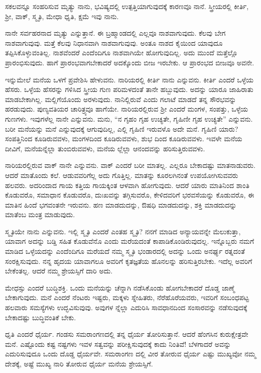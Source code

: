 {\small ಸಕಲವನ್ನೂ ಸಂಹರಿಸುವ ಮೃತ್ಯು ನಾನು, ಭವಿಷ್ಯದಲ್ಲಿ ಉತ್ಪತ್ತಿಯಾಗುವುದಕ್ಕೆ ಕಾರಣವೂ ನಾನೆ. ಸ್ತ್ರೀಯರಲ್ಲಿ ಕೀರ್ತಿ, ಶ‍್ರೀ, ವಾಕ್, ಸ್ಮೃತಿ, ಮೇಧಾ ಧೃತಿ, ಕ್ಷಮೆ ಇವು ನಾನು.}

ನಾನೇ ಸರ್ವಹರನಾದ ಮೃತ್ಯು ಎನ್ನುತ್ತಾನೆ. ಈ ಬ್ರಹ್ಮಾಂಡದಲ್ಲಿ ಎಲ್ಲವೂ ನಾಶವಾಗುವುದು. ಕೆಲವು ಬೇಗ ನಾಶವಾಗುವುವು. ಮತ್ತೆ ಕೆಲವು ನಿಧಾನವಾಗಿ ನಾಶವಾಗುವುವು. ಅಂತೂ ನಾಶದ ಕೈಯಿಂದ ಯಾವುದೂ ತಪ್ಪಿಸಿಕೊಳ್ಳುವಂತಿಲ್ಲ. ನಾಶವೆಂದರೆ ಎಂದೆಂದಿಗೂ ನಾಶವಾಗಿಯೇ ಹೋಗುವುದಿಲ್ಲ. ಅದು ಮುಂದೆ ಮತ್ತೆಲ್ಲೊ ಪ್ರಾರಂಭಿಸುವುದು. ಹಾಗೆ ಪ್ರಾರಂಭವಾಗಬೇಕಾದರೆ ಅದಕ್ಕೊಂದು ಬೀಜ ಇರಬೇಕು. ಆ ಪ್ರಾರಂಭದ ಬೀಜವೂ ಅವನೇ.

ಇನ್ನುಮೇಲೆ ಮನೆಯ ಒಳಗೆ ಪ್ರವೇಶಿಸಿ ಹೇಳುವನು. ನಾರಿಯರಲ್ಲಿ ಕೀರ್ತಿ ನಾನು ಎನ್ನುವನು. ಕೀರ್ತಿ ಎಂದರೆ ಒಳ್ಳೆಯ ಹೆಸರು. ಒಳ್ಳೆಯ ಹೆಸರನ್ನು ಗಳಿಸಿದ ಸ್ತ್ರೀಯ ಗುಣ ಪರಿಮಳದಂತೆ ತಾನೇ ಹಬ್ಬುವುದು. ಅದನ್ನು ಯಾರೂ ಜಾಹಿರಾತು ಮಾಡಬೇಕಾಗಿಲ್ಲ. ಮಲ್ಲಿಗೆಯೊಂದು ಅರಳುವುದು. ನಾನಿಲ್ಲಿರುವೆ ಎಂದು ಗಲಾಟೆ ಮಾಡದೆ ತನ್ನ ಸೌರಭವನ್ನು ಹರಡುವುದು. ಪುಣ್ಯವತಿಯರ ಚಾರಿತ್ರ್ಯವೂ ಹಾಗೆಯೇ. ನಾರಿಯರಲ್ಲಿರುವ ಶ‍್ರೀ ಎಂದರೆ ಮಂಗಳ, ಸಂಪತ್ತು, ಒಳ್ಳೆಯ ಗುಣಗಳು. ಇವುಗಳೆಲ್ಲ ನಾನೇ ಎನ್ನುವನು. ಮನು, “ನ ಗೃಹಂ ಗೃಹ ಉಚ್ಯತೇ, ಗೃಹಿಣೀ ಗೃಹ ಉಚ್ಯತೇ” ಎನ್ನುವನು. ಬರೀ ಮನೆಯನ್ನು ಮನೆ ಎನ್ನುವುದಕ್ಕೆ ಆಗುವುದಿಲ್ಲ, ಎಲ್ಲಿ ಗೃಹಿಣಿ ಇರುವಳೊ ಅದೇ ಮನೆ. ಗೃಹಿಣಿ ಯಾರು? ಸಂಪತ್ತಿನಿಂದ ಕೂಡಿರುವವಳು, ಮಂಗಳದಿಂದ ಕೂಡಿರುವವಳು, ಶುಭ ದಿಂದ ಕೂಡಿರುವವಳು. ಇವಳೇ ಮನೆಯ ದೀವಿಗೆ, ಮನೆಯನ್ನೆಲ್ಲಾ ತುಂಬಿರುವವಳು, ಮನೆಯ ಲ್ಲೆಲ್ಲಾ ಆನಂದವನ್ನು ಹರಿಸುತ್ತಿರುವವಳು.

ನಾರಿಯರಲ್ಲಿರುವ ವಾಕ್ ನಾನೇ ಎನ್ನುವನು. ವಾಕ್ ಎಂದರೆ ಬರೀ ಮಾತಲ್ಲ. ಎಲ್ಲರೂ ಬೇಕಾದಷ್ಟು ಮಾತನಾಡುವರು. ಆದರೆ ಮಾತೊಂದು ಕಲೆ. ಆಡುವವರಿಗೆಲ್ಲ ಅದು ಗೊತ್ತಿಲ್ಲ. ಮಾತನ್ನು ಕೂರಲಗಿನಂತೆ ಉಪಯೋಗಿಸುವವರು ಹಲವರು. ಅದರಿಂದಾದ ಗಾಯ ಕತ್ತಿಯ ಗಾಯಕ್ಕಿಂತ ಆಳವಾಗಿ ಹೋಗುವುದು. ಆದರೆ ಯಾರು ಮಾತಿನಿಂದ ಶಾಂತಿ ಕೊಡುವರೊ, ಸಮಾಧಾನ ಕೊಡುವರೊ, ದುಃಖವನ್ನು ತಗ್ಗಿಸುವರೊ, ಕೇಳಿದವರಿಗೆ ಭರವಸೆಯನ್ನು ಕೊಡುವರೊ, ಈ ಮಾತಿನ ಹಿಂದೆ ಭಗವಂತನೇ ಇರುವನು. ಹಣ ಮಾಡದುದನ್ನು, ಔಷಧಿ ಮಾಡದುದನ್ನು, ಶಕ್ತಿ ಮಾಡದುದನ್ನು ಮಾತೆಂಬ ಮಂತ್ರ ಮಾಡುವುದು.

ಸ್ಮೃತಿಯೇ ನಾನು ಎನ್ನುವನು. ಇಲ್ಲಿ ಸ್ಮೃತಿ ಎಂದರೆ ಎಂತಹ ಸ್ಮೃತಿ? ನನಗೆ ಮಾಡಿದ ಅನ್ಯಾಯವನ್ನೇ ಮೆಲುಕುತ್ತಾ, ಯಾವಾಗ ಅದನ್ನು ಬಡ್ಡಿ ಸಹಿತ ಕೊಡುವೆನೊ ಎಂದು ಮರೆಯದಂತೆ ಕಾಪಾಡಿಕೊಂಡಿರುವುದಲ್ಲ. ಇನ್ನೊಬ್ಬರು ನಮಗೆ ಮಾಡಿದ ಒಳ್ಳೆಯದನ್ನು ಎಂದೆಂದಿಗೂ ಮರೆಯದೆ ನಮ್ಮ ಸ್ಮೃತಿ ಭಂಡಾರದಲ್ಲಿ ಅದನ್ನು ಒಂದು ಅನರ್ಘ್ಯ ರತ್ನದಂತೆ ಸಂರಕ್ಷಿಸುವುದು. ನನ್ನ ಹೃದಯ ಯಾವಾಗಲೂ ಅವರಿಗೆ ಕೃತಜ್ಞತೆಯ ಹೊನಲನ್ನು ಹರಿಸುತ್ತಿರಬೇಕು. ಇದೆಲ್ಲ ಅವರಿಗೆ ಬೇಕೆಂತಲ್ಲ. ಆದರೆ ನಮ್ಮ ಶ್ರೇಯಸ್ಸಿಗೆ ದಾರಿ ಅದು.

ಮೇಧಸ್ಸು ಎಂದರೆ ಬುದ್ಧಿಶಕ್ತಿ. ಒಂದು ಮನೆಯನ್ನು ಚೆನ್ನಾಗಿ ನಡೆಸಿಕೊಂಡು ಹೋಗಬೇಕಾದರೆ ದೊಡ್ಡ ಜಾಣ್ಮೆ ಬೇಕಾಗುವುದು. ಮನೆ ಎಂದರೆ ನೆಂಟರು ಇಷ್ಟರು, ಮಕ್ಕಳು ಸ್ನೇಹಿತರು, ನೆರೆಹೊರೆಯವರು, ಇವರಿಗೆ ಸಂಬಂಧಪಟ್ಟ ಹಲವಾರು ಸಮಸ್ಯೆಗಳು ಉದ್ಭವಿಸುವುವು. ಅವುಗಳ ನ್ನೆಲ್ಲಾ ಎದುರಿಸಿ ಸಾವಧಾನದಿಂದ ಸಂಸಾರವನ್ನು ನಡೆಸುವುದಕ್ಕೆ ಬೇಕಾದಷ್ಟು ಬುದ್ಧಿವಂತಿಕೆ ಬೇಕು.

ಧೃತಿ ಎಂದರೆ ಧೈರ್ಯ. ಗಂಡಸು ಸಮರಾಂಗಣದಲ್ಲಿ ತನ್ನ ಧೈರ್ಯ ತೋರಿಸುತ್ತಾನೆ. ಆದರೆ ಹೆಂಗಸಿನ ಕುರುಕ್ಷೇತ್ರವೇ ಮನೆ. ಎಷ್ಟೊಂದು ಕಷ್ಟ ನಷ್ಟಗಳು ಇವಳ ಸತ್ವವನ್ನು ಪರೀಕ್ಷಿಸುವುದಕ್ಕೆ ಕಾದು ನಿಂತಿವೆ! ಬೆಳಗಾದರೆ ಅವನ್ನು ಎದುರಿಸುವುದೂ ಒಂದು ದೊಡ್ಡ ಧೈರ್ಯವೇ. ಸಮರಾಂಗಣ ದಲ್ಲಿ ವೀರ ತೋರುವ ಧೈರ್ಯ ಎಷ್ಟು ಮುಖ್ಯವೋ ನಮ್ಮ ದೇಶಕ್ಕೆ, ಅಷ್ಟೆ ಮುಖ್ಯ ನಾರಿ ತೋರುವ ಧೈರ್ಯ ಮನೆಯ ಶ್ರೇಯಸ್ಸಿಗೆ. 

